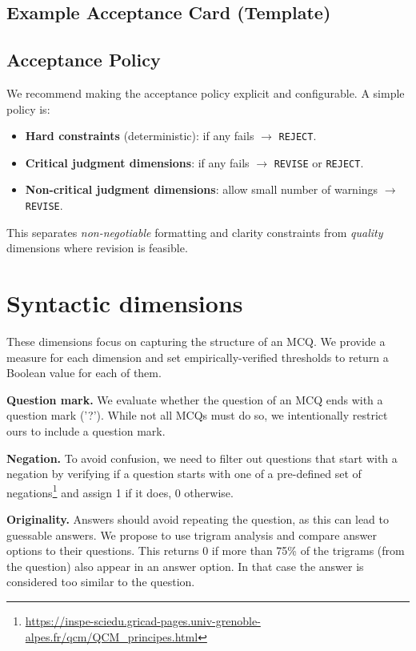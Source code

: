 \documentclass[11pt]{article}
\begin{document}
\subsection{Example Acceptance Card (Template)}


\subsection{Acceptance Policy}
We recommend making the acceptance policy explicit and configurable. A simple policy is:

\begin{itemize}[leftmargin=*]
  \item \textbf{Hard constraints} (deterministic): if any fails $\rightarrow$ \texttt{REJECT}.
  \item \textbf{Critical judgment dimensions}: if any fails $\rightarrow$ \texttt{REVISE} or \texttt{REJECT}.
  \item \textbf{Non-critical judgment dimensions}: allow small number of warnings $\rightarrow$ \texttt{REVISE}.
\end{itemize}

This separates \emph{non-negotiable} formatting and clarity constraints from \emph{quality} dimensions where revision is feasible.

\section{Syntactic dimensions}
These dimensions focus on capturing the structure of an MCQ. We provide a measure for each dimension and set empirically-verified thresholds to return a Boolean value for each of them.

{\bf Question mark.}
   We evaluate whether the question of an MCQ ends with a question mark ('?'). While not all MCQs must do so, we intentionally restrict ours to include a question mark.
   
{\bf Negation.}
    To avoid confusion, we need to filter out questions that start with a negation by verifying if a question starts with one of a pre-defined set of negations\footnote{\url{https://inspe-sciedu.gricad-pages.univ-grenoble-alpes.fr/qcm/QCM_principes.html}} and assign 1 if it does, 0 otherwise.

{\bf Originality.}
    Answers should avoid repeating the question, as this can lead to guessable answers. We propose to use trigram analysis and compare answer options to their questions. This returns 0 if more than 75\% of the trigrams (from the question) also appear in an answer option. In that case the answer is considered too similar to the question.
\end{document}
